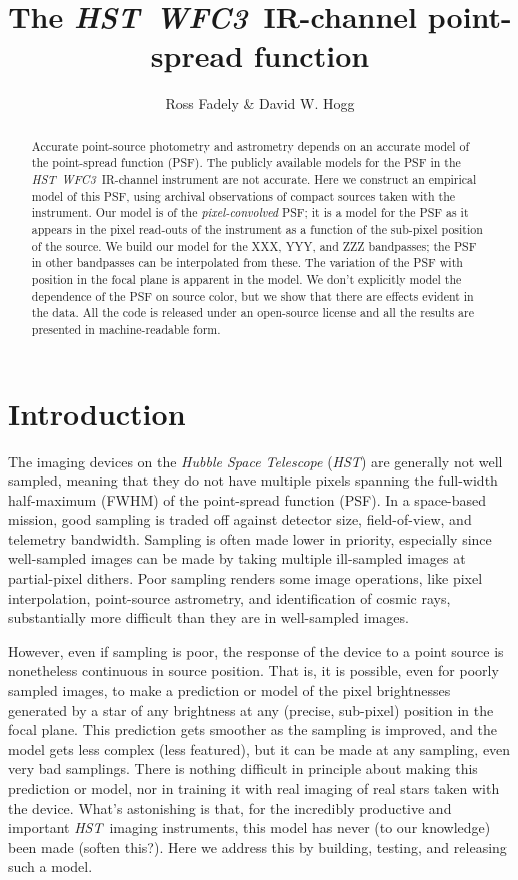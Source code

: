 \documentclass[12pt,letterpaper,preprint]{aastex}
\newcommand{\instrument}[1]{\textsl{#1}}
\newcommand{\HST}{\instrument{HST}}
\newcommand{\WFC}{\instrument{WFC3}}
\begin{document}
\title{The \HST\ \WFC\ IR-channel point-spread function}
\author{Ross Fadely \& David W. Hogg}

\begin{abstract}
Accurate point-source photometry and astrometry depends on an accurate model of the point-spread function (PSF).
The publicly available models for the PSF in the \HST\ \WFC\ IR-channel instrument are not accurate.
Here we construct an empirical model of this PSF,
  using archival observations of compact sources taken with the instrument.
Our model is of the \emph{pixel-convolved} PSF;
  it is a model for the PSF as it appears in the pixel read-outs of the instrument
  as a function of the sub-pixel position of the source.
We build our model for the XXX, YYY, and ZZZ bandpasses;
  the PSF in other bandpasses can be interpolated from these.
The variation of the PSF with position in the focal plane
  is apparent in the model.
We don't explicitly model the dependence of the PSF on source color,
  but we show that there are effects evident in the data.
All the code is released under an open-source license
  and all the results are presented in machine-readable form.
\end{abstract}


\section{Introduction}

The imaging devices on the \instrument{Hubble Space Telescope} (\HST) are generally not well sampled,
  meaning that they do not have multiple pixels spanning the full-width half-maximum (FWHM)
  of the point-spread function (PSF).
In a space-based mission,
  good sampling is traded off against detector size, field-of-view, and telemetry bandwidth.
Sampling is often made lower in priority,
  especially since well-sampled images can be made by taking multiple
  ill-sampled images at partial-pixel dithers.
Poor sampling renders some image operations,
  like pixel interpolation, point-source astrometry, and identification of cosmic rays,
  substantially more difficult than they are in well-sampled images.

However, even if sampling is poor,
  the response of the device to a point source is nonetheless continuous in source position.
That is, it is possible, even for poorly sampled images,
  to make a prediction or model of the pixel brightnesses generated by
  a star of any brightness at any (precise, sub-pixel) position in the focal plane.
This prediction gets smoother as the sampling is improved,
  and the model gets less complex (less featured),
  but it can be made at any sampling, even very bad samplings.
There is nothing difficult in principle about making this prediction or model,
  nor in training it with real imaging of real stars taken with the device.
What's astonishing is that,
  for the incredibly productive and important \HST\ imaging instruments,
  this model has never (to our knowledge) been made (soften this?).
Here we address this by building, testing, and releasing such a model.
\end{document}

